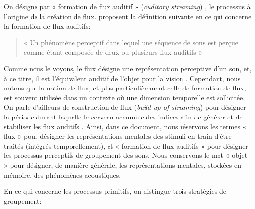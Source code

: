 On désigne par « formation de flux auditif » (\emph{auditory streaming}) , le processus à l'origine de la création de flux. \citep{winkler2009modeling} proposent la définition suivante en ce qui concerne la formation de flux auditifs:

\begin{quote}
«  Un phénomène perceptif dans lequel une séquence de sons est perçue comme étant composée de deux ou plusieurs flux auditifs  »
\end{quote}

Comme nous le voyons, le flux désigne une représentation perceptive d'un son, et, à ce titre, il est l'équivalent auditif de l'objet pour la vision \citep[p. 11]{bregman1994auditory}. Cependant, nous notons que la notion de flux, et plus particulièrement celle de formation de flux, est souvent utilisée dans un contexte où une dimension temporelle est sollicitée. On parle d'ailleurs de construction de flux (\emph{build-up of streaming}) pour désigner la période durant laquelle le cerveau accumule des indices afin de générer et de stabiliser les flux auditifs  \citep{cusack2004effects,snyder2007toward}. Ainsi, dans ce document, nous réservons les termes « flux » pour désigner les représentations mentales des stimuli en train d'être traités (intégrés temporellement), et « formation de flux auditifs » pour désigner les processus perceptifs de groupement des sons. Nous conservons le mot « objet » pour désigner, de manière générale, les représentations mentales, stockées en mémoire, des phénomènes acoustiques.

En ce qui concerne les processus primitifs, on distingue trois stratégies de groupement:

